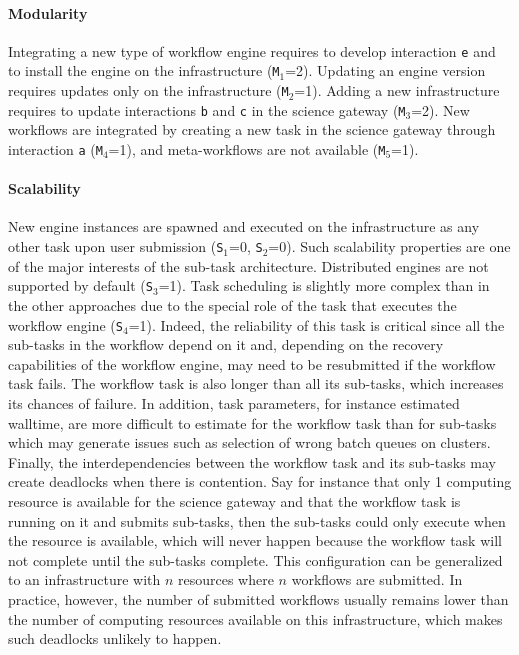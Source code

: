 \documentclass[preprint,3p,twocolumn]{elsarticle}
\begin{document}
\paragraph{Modularity} Integrating a new type of workflow engine
requires to develop interaction \texttt{e} and to install the engine
on the infrastructure (\texttt{M$_1$}=2). Updating an engine version
requires updates only on the infrastructure (\texttt{M$_2$}=1). Adding
a new infrastructure requires to update interactions \texttt{b} and
\texttt{c} in the science gateway (\texttt{M$_3$}=2). New workflows are integrated by
creating a new task in the science gateway through interaction
\texttt{a} (\texttt{M$_4$}=1), and meta-workflows are not available
(\texttt{M$_5$}=1).

\paragraph{Scalability}
New engine instances are spawned and executed on the infrastructure as
any other task upon user submission (\texttt{S$_1$}=0,
\texttt{S$_2$}=0). Such scalability properties are one of the major
interests of the sub-task architecture. Distributed engines are not
supported by default (\texttt{S$_3$}=1). Task scheduling is slightly
more complex than in the other approaches due to the special role of
the task that executes the workflow engine (\texttt{S$_4$}=1). Indeed,
the reliability of this task is critical since all the sub-tasks in
the workflow depend on it and, depending on the recovery capabilities
of the workflow engine, may need to be resubmitted if the workflow
task fails. The workflow task is also longer than all its sub-tasks,
which increases its chances of failure. In addition, task parameters,
for instance estimated walltime, are more difficult to estimate for
the workflow task than for sub-tasks which may generate issues such as
selection of wrong batch queues on clusters. Finally, the
interdependencies between the workflow task and its sub-tasks may
create deadlocks when there is contention. Say for instance that only
1 computing resource is available for the science gateway and that the
workflow task is running on it and submits sub-tasks, then the
sub-tasks could only execute when the resource is available, which
will never happen because the workflow task will not complete until
the sub-tasks complete. This configuration can be generalized to an
infrastructure with $n$ resources where $n$ workflows are
submitted. In practice, however, the number of submitted workflows
usually remains lower than the number of computing resources available
on this infrastructure, which makes such deadlocks unlikely to happen.
\end{document}
